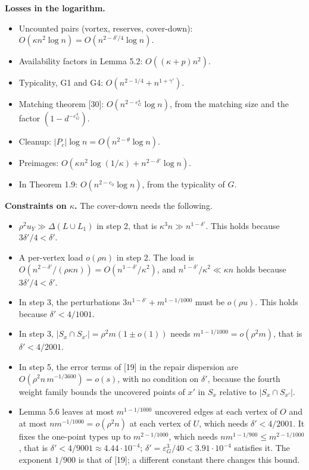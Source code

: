 \documentclass[english,11pt,a4paper]{article}
\providecommand{\tightlist}{\setlength{\itemsep}{0pt}\setlength{\parskip}{0pt}}
\begin{document}
\textbf{Losses in the logarithm.}

\begin{itemize}
\tightlist
\item
  Uncounted pairs (vortex, reserves, cover-down): \(O(\kappa n^2\log n)=O(n^{2-\delta'/4}\log n)\).
\item
  Availability factors in Lemma 5.2: \(O((\kappa+p)n^2)\).
\item
  Typicality, G1 and G4: \(O(n^{2-1/4}+n^{1+\gamma'})\).
\item
  Matching theorem {[}30{]}: \(O(n^{2-\varepsilon_G^4}\log n)\), from the matching size and the factor \((1-d^{-\varepsilon_G^4})\).
\item
  Cleanup: \(|P_c|\log n=O(n^{2-\theta}\log n)\).
\item
  Preimages: \(O(\kappa n^2\log(1/\kappa)+n^{2-\delta'}\log n)\).
\item
  In Theorem 1.9: \(O(n^{2-c_0}\log n)\), from the typicality of \(G\).
\end{itemize}

\textbf{Constraints on \(\kappa\).} The cover-down needs the following.

\begin{itemize}
\tightlist
\item
  \(\rho^2u_Y\gg\Delta(L\cup L_1)\) in step 2, that is \(\kappa^3n\gg n^{1-\delta'}\). This holds because \(3\delta'/4<\delta'\).
\item
  A per-vertex load \(o(\rho n)\) in step 2. The load is \(O(n^{2-\delta'}/(\rho\kappa n))=O(n^{1-\delta'}/\kappa^2)\), and \(n^{1-\delta'}/\kappa^2\ll\kappa n\) holds because \(3\delta'/4<\delta'\).
\item
  In step 3, the perturbations \(3n^{1-\delta'}+m^{1-1/1000}\) must be \(o(\rho u)\). This holds because \(\delta'<4/1001\).
\item
  In step 3, \(|S_x\cap S_{x'}|=\rho^2m(1\pm o(1))\) needs \(m^{1-1/1000}=o(\rho^2m)\), that is \(\delta'<4/2001\).
\item
  In step 5, the error terms of {[}19{]} in the repair dispersion are \(O(\rho^2n\,m^{-1/3600})=o(s)\), with no condition on \(\delta'\), because the fourth weight family bounds the uncovered points of \(x'\) in \(S_x\) relative to \(|S_x\cap S_{x'}|\).
\item
  Lemma 5.6 leaves at most \(m^{1-1/1000}\) uncovered edges at each vertex of \(O\) and at most \(nm^{-1/1000}=o(\rho^2n)\) at each vertex of \(U\), which needs \(\delta'<4/2001\). It fixes the one-point types up to \(m^{2-1/1000}\), which needs \(nm^{1-1/900}\le m^{2-1/1000}\), that is \(\delta'<4/9001\approx4.44\cdot10^{-4}\); \(\delta'=\varepsilon_G^3/40<3.91\cdot10^{-4}\) satisfies it. The exponent \(1/900\) is that of {[}19{]}; a different constant there changes this bound.
\end{itemize}
\end{document}
